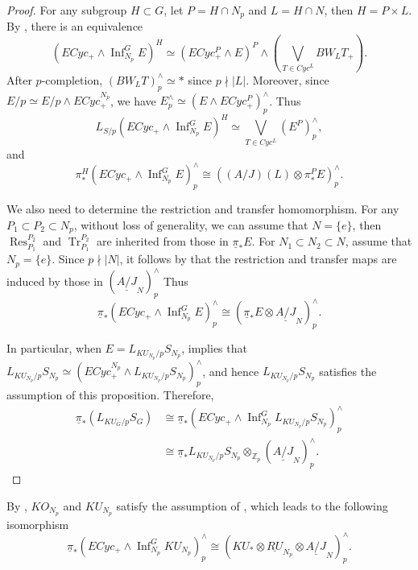 \documentclass{amsart}
\theoremstyle{plain}
\theoremstyle{definition}
\theoremstyle{remark}
\begin{document}
\begin{proof}
    For any subgroup $H\subset G$, let $P=H\cap N_p$ and $L=H\cap N$, then $H=P\times L$. By , there is an equivalence
    \[
    (ECyc_+\wedge \operatorname{Inf}_{N_p}^G E)^H \simeq (ECyc^P_+\wedge E)^P \wedge (\bigvee_{T\in Cyc^L}BW_L T_+).
    \]
    After $p$-completion, $(BW_L T)_p^\wedge\simeq \ast$ since $p\nmid |L|$. Moreover, since $E/p\simeq E/p\wedge ECyc^{N_p}_+$, we have $E_p^\wedge\simeq (E\wedge ECyc^P_+)_p^\wedge$. Thus
    \[
    L_{S/p}(ECyc_+\wedge \operatorname{Inf}_{N_p}^G E)^H \simeq \bigvee_{T\in Cyc^L} (E^P)_p^\wedge ,
    \]
    and 
    \[
    \pi_*^H (ECyc_+\wedge \operatorname{Inf}_{N_p}^G E)_p^\wedge\cong ((A/J)(L) \otimes \pi_*^P E)_p^\wedge.
    \]

    We also need to determine the restriction and transfer homomorphism. For any $P_1\subset P_2\subset N_p$, without loss of generality, we can assume that $N=\{e\}$, then $\operatorname{Res}_{P_1}^{P_2}$ and $\operatorname{Tr}_{P_1}^{P_2}$ are inherited from those in $\underline{\pi}_* E$. For $N_1\subset N_2\subset N$, assume that $N_p=\{e\}$. Since $p\nmid |N|$, it follows by \cite[Corollary 7.12]{bonventre2022ku_g} that the restriction and transfer maps are induced by those in $(\underline{A/J}_N)_p^\wedge$ Thus 
    \[ \underline{\pi}_*(ECyc_+\wedge \operatorname{Inf}_{N_p}^G E)_p^\wedge\cong (\underline{\pi}_* E \otimes \underline{A/J}_N)_p^\wedge. \] 

    In particular, when $E=L_{KU_{N_p}/p}S_{N_p}$,  implies that
    $L_{KU_{N_p}/p}S_{N_p}\simeq (ECyc^{N_p}_+\wedge L_{KU_{N_p}/p}S_{N_p})_p^\wedge$, and hence $L_{KU_{N_p}/p}S_{N_p}$    satisfies the assumption of this proposition. Therefore, 
    \[
    \begin{aligned}
        \underline{\pi}_*(L_{KU_G/p}S_G) & \cong \underline{\pi}_*(ECyc_+\wedge \operatorname{Inf}_{N_p}^G L_{KU_{N_p}/p}S_{N_p})_p^\wedge \\
        & \cong \underline{\pi}_*L_{KU_{N_p}/p}S_{N_p}\otimes_{\mathbb{Z}_p} (\underline{A/J}_N)_p^\wedge .
    \end{aligned}
    \]
\end{proof}

    By , $KO_{N_p}$ and $KU_{N_p}$ satisfy the assumption of , which leads to the following isomorphism
    \[ \underline{\pi}_*(ECyc_+\wedge \operatorname{Inf}_{N_p}^G KU_{N_p})_p^\wedge\cong (KU_*\otimes \underline{RU}_{N_p}\otimes \underline{A/J}_N)_p^\wedge. \] 
\end{document}
